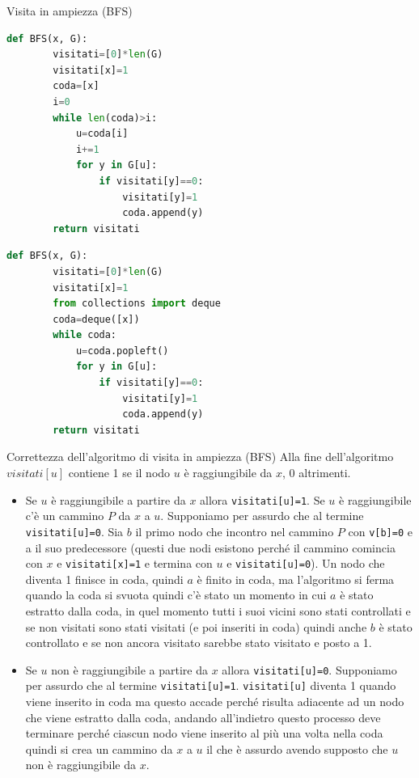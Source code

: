 \begin{Algoritmo}{Visita in ampiezza (BFS)}{}
    \begin{minipage}[t]{0.50\textwidth}
    \begin{lstlisting}[language=Python]
    def BFS(x, G):
        visitati=[0]*len(G)
        visitati[x]=1
        coda=[x]
        i=0
        while len(coda)>i:
            u=coda[i]
            i+=1
            for y in G[u]:
                if visitati[y]==0:
                    visitati[y]=1
                    coda.append(y)
        return visitati
    \end{lstlisting}
    \end{minipage}
    \hspace{-1cm}
    \begin{minipage}[t]{0.50\textwidth}
    \begin{lstlisting}[language=Python]
    def BFS(x, G):
        visitati=[0]*len(G)
        visitati[x]=1
        from collections import deque
        coda=deque([x])
        while coda:
            u=coda.popleft()
            for y in G[u]:
                if visitati[y]==0:
                    visitati[y]=1
                    coda.append(y)
        return visitati
    \end{lstlisting}
    \end{minipage}
\end{Algoritmo}

\begin{Thm}{Correttezza dell'algoritmo di visita in ampiezza (BFS)}{}
    Alla fine dell'algoritmo $visitati[u]$ contiene 1 se il nodo $u$ è raggiungibile da $x$, 0 altrimenti.
    \begin{demonstration}\phantom{}
    \begin{itemize}
        \item Se $u$ è raggiungibile a partire da $x$ allora \verb|visitati[u]=1|. Se $u$ è raggiungibile c'è un cammino $P$ da $x$ a $u$. Supponiamo per assurdo che al termine \verb|visitati[u]=0|. Sia $b$ il primo nodo che incontro nel cammino $P$ con \verb|v[b]=0| e a il suo predecessore (questi due nodi esistono perché il cammino comincia con $x$ e \verb|visitati[x]=1| e termina con $u$ e \verb|visitati[u]=0|). Un nodo che diventa 1 finisce in coda, quindi $a$ è finito in coda, ma l'algoritmo si ferma quando la coda si svuota quindi c'è stato un momento in cui $a$ è stato estratto dalla coda, in quel momento tutti i suoi vicini sono stati controllati e se non visitati sono stati visitati (e poi inseriti in coda) quindi anche $b$ è stato controllato e se non ancora visitato sarebbe stato visitato e posto a 1.
        \item Se $u$ non è raggiungibile a partire da $x$ allora \verb|visitati[u]=0|. Supponiamo per assurdo che al termine \verb|visitati[u]=1|. \verb|visitati[u]| diventa 1 quando viene inserito in coda ma questo accade perché risulta adiacente ad un nodo che viene estratto dalla coda, andando all'indietro questo processo deve terminare perché ciascun nodo viene inserito al più una volta nella coda quindi si crea un cammino da $x$ a $u$ il che è assurdo avendo supposto che $u$ non è raggiungibile da $x$.
    \end{itemize}
    \end{demonstration}
\end{Thm}


